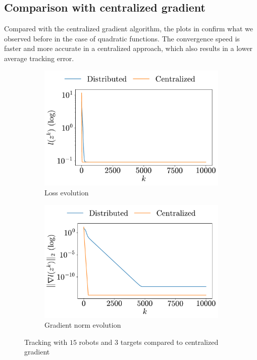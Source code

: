 \documentclass[a4paper,11pt,oneside]{book}
\begin{document}
\subsection{Comparison with centralized gradient}

Compared with the centralized gradient algorithm, the plots in  confirm what we observed before in the case of quadratic functions. The convergence speed is faster and more accurate in a centralized approach, which also results in a lower average tracking error.

\begin{figure}[h!]
      \centering
      \begin{subfigure}[h]{0.43\linewidth}
            \centering
            \includegraphics[width=\linewidth]{./figs/tracking/centralized/loss.pdf} 
            \caption{Loss evolution}
      \end{subfigure}
      \hfill
      \begin{subfigure}[h]{0.43\linewidth}
            \centering
            \includegraphics[width=\linewidth]{./figs/tracking/centralized/gradient.pdf} 
            \caption{Gradient norm evolution}
      \end{subfigure}
      \caption{Tracking with $15$ robots and $3$ targets compared to centralized gradient}
      \label{fig:tracking_centralized_5_3}
\end{figure}
\end{document}
